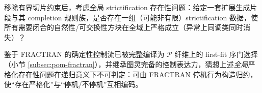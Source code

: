 \begin{conjecture}\label{conj:pom-global-strictification-undecidable}
移除有界切片约束后，考虑全局 strictification 存在性问题：给定一套扩展生成片段与其 completion 规则族，是否存在一组（可能非有限）strictification 数据，使所有需要闭合的自然性/可交换性方块在全域上严格成立（异常上同调类同时消失）？
\par
鉴于 FRACTRAN 的确定性控制流已被完整编译为 \(\mathcal{P}\) 纤维上的 first-fit 序门选择（小节 \ref{subsec:pom-fractran}），并继承图灵完备的控制表达力，猜想上述\emph{全局}严格化存在性问题在递归意义下不可判定：可由 FRACTRAN 停机行为构造归约，使“存在严格化”与“停机/不停机”互相编码。
\end{conjecture}
